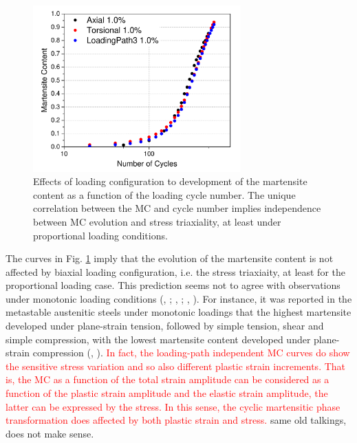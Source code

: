 \documentclass[final,5p,times,onecolumn,10pt,sort&compress]{elsarticle}
\newcommand{\marked}[1]{\textcolor{red}{#1}}
\begin{document}
\begin{figure}[!h]
  \begin{center}
  \includegraphics[width=8cm]{proportional1.pdf}
  \caption{Effects of loading configuration to development of the martensite content as a function of the loading cycle number. The unique correlation between the MC and cycle number implies independence between MC evolution and stress triaxiality, at least under proportional loading conditions.}
  \label{fig:proportional1}
  \end{center}
\end{figure}

The curves in Fig. \ref{fig:proportional1} imply that the evolution of the martensite content is not affected by biaxial loading configuration, i.e. the stress triaxiaity, at least for the proportional loading case. This prediction seems not to agree with observations under monotonic loading conditions (\citeauthor{Santacreu2006Behaviour}, \citeyear{Santacreu2006Behaviour}; \citeauthor{Beese2011Effect}, \citeyear{Beese2011Effect}; \citeauthor{Stringfellow1992A}, \citeyear{Stringfellow1992A}). For instance, it was reported in the metastable austenitic steels under monotonic loadings that the highest martensite developed under plane-strain tension, followed by simple tension, shear and simple compression, with the lowest martensite content developed under plane-strain compression (\citeauthor{Stringfellow1992A}, \citeyear{Stringfellow1992A}). \marked{In fact, the loading-path independent MC curves do show the sensitive stress variation and so also different plastic strain increments. That is, the MC as a function of the total strain amplitude can be considered as a function of the plastic strain amplitude and the elastic strain amplitude, the latter can be expressed by the stress. In this sense, the cyclic martensitic phase transformation does affected by both plastic strain and stress.}
same old talkings, does not make sense.
\end{document}
